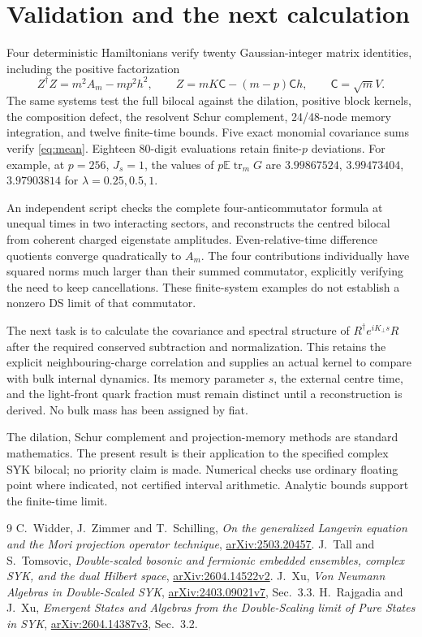 \documentclass[11pt,a4paper]{article}
\newcommand{\EE}{\mathbb E}
\DeclareMathOperator{\tr}{tr}
\begin{document}
\newpage
\section*{Validation and the next calculation}
Four deterministic Hamiltonians verify twenty Gaussian-integer matrix
identities, including the positive factorization
\begin{equation}
 Z^\dagger Z=m^2 A_m-mp^2h^2,\qquad
 Z=mK\mathsf C-(m-p)\mathsf C h,\qquad \mathsf C=\sqrt m V.
\end{equation}
The same systems test the full bilocal against the dilation, positive
block kernels, the composition defect, the resolvent Schur complement,
24/48-node memory integration, and twelve finite-time bounds.
Five exact monomial covariance sums verify \eqref{eq:mean}.
Eighteen 80-digit evaluations retain finite-$p$ deviations. For example,
at $p=256$, $J_s=1$, the values of $p\EE\tr_mG$ are
$3.99867524$, $3.99473404$, $3.97903814$ for
$\lambda=0.25,0.5,1$.

An independent script checks the complete four-anticommutator formula
at unequal times in two interacting sectors, and reconstructs the
centred bilocal from coherent charged eigenstate amplitudes.
Even-relative-time difference quotients converge quadratically to
$A_m$. The four contributions individually have squared norms much
larger than their summed commutator, explicitly verifying the need
to keep cancellations. These finite-system examples do not establish
a nonzero DS limit of that commutator.

The next task is to calculate the covariance and spectral structure of
$R^\dagger e^{iK_\perp s}R$ after the required conserved subtraction
and normalization. This retains the explicit neighbouring-charge
correlation and supplies an actual kernel to compare with bulk
internal dynamics. Its memory parameter $s$, the external centre time,
and the light-front quark fraction must remain distinct until a
reconstruction is derived. No bulk mass has been assigned by fiat.

The dilation, Schur complement and projection-memory methods are
standard mathematics. The present result is their application to the
specified complex SYK bilocal; no priority claim is made. Numerical
checks use ordinary floating point where indicated, not certified
interval arithmetic. Analytic bounds support the finite-time limit.

\begin{thebibliography}{9}
 C.~Widder, J.~Zimmer and T.~Schilling,
\emph{On the generalized Langevin equation and the Mori projection
operator technique}, \href{https://arxiv.org/abs/2503.20457}{arXiv:2503.20457}.
 J.~Tall and S.~Tomsovic,
\emph{Double-scaled bosonic and fermionic embedded ensembles,
complex SYK, and the dual Hilbert space},
\href{https://arxiv.org/abs/2604.14522v2}{arXiv:2604.14522v2}.
 J.~Xu, \emph{Von Neumann Algebras in Double-Scaled SYK},
\href{https://arxiv.org/abs/2403.09021v7}{arXiv:2403.09021v7}, Sec.~3.3.
 H.~Rajgadia and J.~Xu,
\emph{Emergent States and Algebras from the Double-Scaling limit of
Pure States in SYK}, \href{https://arxiv.org/abs/2604.14387v3}{arXiv:2604.14387v3},
Sec.~3.2.
\end{thebibliography}
\end{document}

